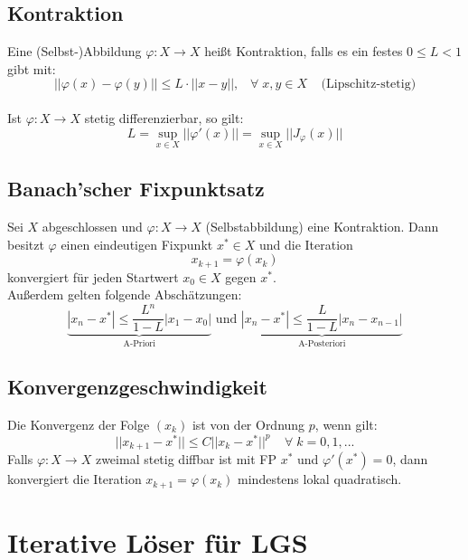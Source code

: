 \documentclass[4pt,a4paper]{scrartcl}
\begin{document}
\begin{multicols}{4}
\subsection{Kontraktion}
Eine (Selbst-)Abbildung $\varphi:X\rightarrow X$ heißt Kontraktion, falls es ein festes $0\leq L<1$ gibt mit:
\begin{equation*}
||\varphi(x)-\varphi(y)||\leq L\cdot ||x-y||,\;\;\;\forall\;x,y\in X\;\;\;\;\text{(Lipschitz-stetig)}
\end{equation*}\\
Ist $\varphi:X\rightarrow X$ stetig differenzierbar, so gilt:
\begin{equation*}
L=\sup\limits_{x\in X}||\varphi'(x)||=\sup\limits_{x\in X}||J_{\varphi}(x)||
\end{equation*}

\subsection{Banach'scher Fixpunktsatz}
Sei $X$ abgeschlossen und $\varphi:X\rightarrow X$ (Selbstabbildung) eine Kontraktion. Dann besitzt $\varphi$ einen eindeutigen Fixpunkt $x^*\in X$ und die Iteration
\begin{equation*}
x_{k+1}=\varphi(x_k)
\end{equation*}
konvergiert für jeden Startwert $x_0\in X$ gegen $x^*$.\\
Außerdem gelten folgende Abschätzungen:
\begin{equation*}
\underbrace{|x_n-x^*|\leq \frac{L^n}{1-L}|x_1-x_0|}_{\text{A-Priori}}\text{ und }\underbrace{|x_n-x^*|\leq\frac{L}{1-L}|x_n-x_{n-1}|}_{\text{A-Posteriori}}
\end{equation*}

\subsection{Konvergenzgeschwindigkeit}
Die Konvergenz der Folge $(x_k)$ ist von der Ordnung $p$, wenn gilt:
\begin{equation*}
||x_{k+1}-x^*||\leq C||x_k-x^*||^p\;\;\;\;\forall\;k=0,1,...
\end{equation*}
Falls $\varphi:X\rightarrow X$ zweimal stetig diffbar ist mit FP $x^*$ und $\varphi'(x^*)=0$, dann konvergiert die Iteration $x_{k+1}=\varphi(x_k)$ mindestens lokal quadratisch.

\section{Iterative Löser für LGS}


\end{multicols}
\end{document}
